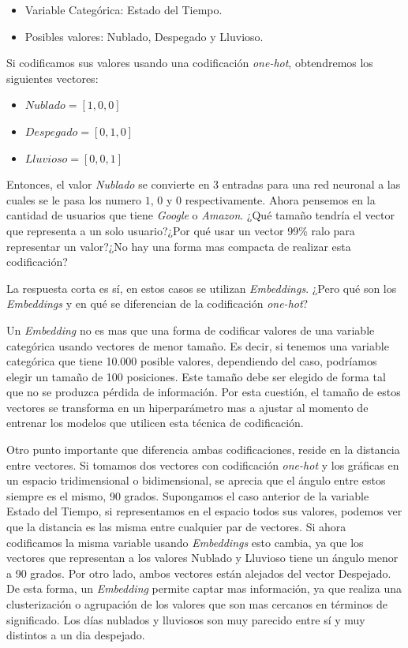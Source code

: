 \documentclass[11pt,a4paper,twoside]{thesis}
\begin{document}
\begin{itemize}
	\item Variable Categórica: Estado del Tiempo.
	\item Posibles valores: Nublado, Despegado y Lluvioso.
\end{itemize}

Si codificamos sus valores usando una codificación \textit{one-hot},
obtendremos los siguientes vectores:

\begin{itemize}
	\item $Nublado    = [1, 0, 0]$
	\item $Despegado  = [0, 1, 0]$
	\item $Lluvioso   = [0, 0, 1]$
\end{itemize}

Entonces, el valor \textit{Nublado} se convierte en 3 entradas para una red
neuronal a las cuales se le pasa los numero $1$, $0$ y $0$ respectivamente.
Ahora pensemos en la cantidad de usuarios que tiene \textit{Google} o
\textit{Amazon}. ¿Qué tamaño tendría el vector que representa a un solo
usuario?¿Por qué usar un vector 99\% ralo para representar un valor?¿No hay una
forma mas compacta de realizar esta codificación?

La respuesta corta es sí, en estos casos se utilizan \textit{Embeddings}. ¿Pero
qué son los \textit{Embeddings} y en qué se diferencian de la codificación
\textit{one-hot}?

Un \textit{Embedding} no es mas que una forma de codificar valores de una
variable categórica usando vectores de menor tamaño. Es decir, si tenemos una
variable categórica que tiene 10.000 posible valores, dependiendo del caso,
podríamos elegir un tamaño de 100 posiciones. Este tamaño debe ser elegido de
forma tal que no se produzca pérdida de información. Por esta cuestión, el
tamaño de estos vectores se transforma en un hiperparámetro mas a ajustar al
momento de entrenar los modelos que utilicen esta técnica de codificación.

Otro punto importante que diferencia ambas codificaciones, reside en la
distancia entre vectores. Si tomamos dos vectores con codificación
\textit{one-hot} y los gráficas en un espacio tridimensional o bidimensional,
se aprecia que el ángulo entre estos siempre es el mismo, 90 grados. Supongamos
el caso anterior de la variable Estado del Tiempo, si representamos en el
espacio todos sus valores, podemos ver que la distancia es las misma entre
cualquier par de vectores. Si ahora codificamos la misma variable usando
\textit{Embeddings} esto cambia, ya que los vectores que representan a los
valores Nublado y Lluvioso tiene un ángulo menor a 90 grados. Por otro lado,
ambos vectores están alejados del vector Despejado. De esta forma, un
\textit{Embedding} permite captar mas información, ya que realiza una
clusterización o agrupación de los valores que son mas cercanos en términos de
significado. Los días nublados y lluviosos son muy parecido entre sí y muy
distintos a un dia despejado.
\end{document}
